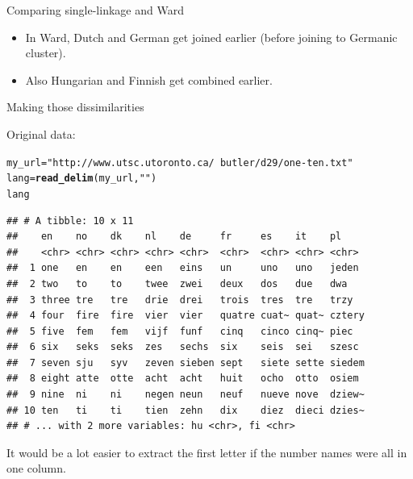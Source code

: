 \documentclass[unknownkeysallowed]{beamer}\usepackage[]{graphicx}\usepackage[]{color}
\makeatletter
\newcommand{\hlstr}[1]{\textcolor[rgb]{0.192,0.494,0.8}{#1}}%
\newcommand{\hlstd}[1]{\textcolor[rgb]{0.345,0.345,0.345}{#1}}%
\newcommand{\hlkwb}[1]{\textcolor[rgb]{0.69,0.353,0.396}{#1}}%
\newcommand{\hlkwd}[1]{\textcolor[rgb]{0.737,0.353,0.396}{\textbf{#1}}}%
\newenvironment{kframe}{%
 \def\at@end@of@kframe{}%
 \ifinner\ifhmode%
  \def\at@end@of@kframe{\end{minipage}}%
  \begin{minipage}{\columnwidth}%
 \fi\fi%
 \def\FrameCommand##1{\hskip\@totalleftmargin \hskip-\fboxsep
 \colorbox{shadecolor}{##1}\hskip-\fboxsep
     \hskip-\linewidth \hskip-\@totalleftmargin \hskip\columnwidth}%
 \MakeFramed {\advance\hsize-\width
   \@totalleftmargin\z@ \linewidth\hsize
   \@setminipage}}%
 {\par\unskip\endMakeFramed%
 \at@end@of@kframe}
\newenvironment{knitrout}{}{} %
\makeatother
\begin{document}
\begin{frame}[fragile]{Comparing single-linkage and Ward}

  \begin{itemize}
  \item In Ward, Dutch and German get joined earlier (before joining to Germanic cluster).
  \item Also Hungarian and Finnish get combined earlier.
  \end{itemize}
  
\end{frame}


\begin{frame}[fragile]{Making those dissimilarities}

Original data:




\begin{knitrout}\footnotesize
{}\color{fgcolor}\begin{kframe}
\begin{alltt}
\hlstd{my_url}\hlkwb{=}\hlstr{"http://www.utsc.utoronto.ca/~butler/d29/one-ten.txt"}
\hlstd{lang}\hlkwb{=}\hlkwd{read_delim}\hlstd{(my_url,}\hlstr{" "}\hlstd{)}
\hlstd{lang}
\end{alltt}
\begin{verbatim}
## # A tibble: 10 x 11
##    en    no    dk    nl    de     fr     es    it    pl    
##    <chr> <chr> <chr> <chr> <chr>  <chr>  <chr> <chr> <chr> 
##  1 one   en    en    een   eins   un     uno   uno   jeden 
##  2 two   to    to    twee  zwei   deux   dos   due   dwa   
##  3 three tre   tre   drie  drei   trois  tres  tre   trzy  
##  4 four  fire  fire  vier  vier   quatre cuat~ quat~ cztery
##  5 five  fem   fem   vijf  funf   cinq   cinco cinq~ piec  
##  6 six   seks  seks  zes   sechs  six    seis  sei   szesc 
##  7 seven sju   syv   zeven sieben sept   siete sette siedem
##  8 eight atte  otte  acht  acht   huit   ocho  otto  osiem 
##  9 nine  ni    ni    negen neun   neuf   nueve nove  dziew~
## 10 ten   ti    ti    tien  zehn   dix    diez  dieci dzies~
## # ... with 2 more variables: hu <chr>, fi <chr>
\end{verbatim}
\end{kframe}
\end{knitrout}

It would be a lot easier to extract the first letter if the number
names were all in one column.
  
\end{frame}
\end{document}
